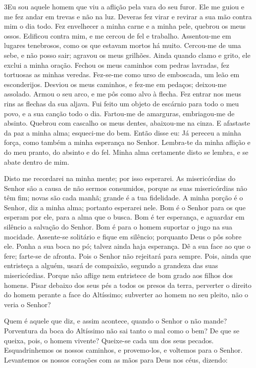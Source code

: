 \medskip

\lettrine{3} Eu sou aquele homem que viu a aflição pela vara
do seu furor. Ele me guiou e me fez andar em trevas e não na
luz. Deveras fez virar e revirar a sua mão contra mim o dia
todo. Fez envelhecer a minha carne e a minha pele, quebrou os
meus ossos. Edificou contra mim, e me cercou de fel e trabalho.
Assentou-me em lugares tenebrosos, como os que estavam mortos há
muito. Cercou-me de uma sebe, e não posso sair; agravou os meus
grilhões. Ainda quando clamo e grito, ele exclui a minha oração.
Fechou os meus caminhos com pedras lavradas, fez tortuosas as
minhas veredas. Fez-se-me como urso de emboscada, um leão em
esconderijos. Desviou os meus caminhos, e fez-me em pedaços;
deixou-me assolado. Armou o seu arco, e me pôs como alvo à
flecha. Fez entrar nos meus rins as flechas da sua aljava.
Fui feito um objeto de escárnio para todo o meu povo, e a sua
canção todo o dia. Fartou-me de amarguras, embriagou-me de
absinto. Quebrou com cascalho os meus dentes, abaixou-me na
cinza. E afastaste da paz a minha alma; esqueci-me do bem.
Então disse eu: Já pereceu a minha força, como também a minha
esperança no Senhor. Lembra-te da minha aflição e do meu
pranto, do absinto e do fel. Minha alma certamente disto se
lembra, e se abate dentro de mim.

Disto me recordarei na minha mente; por isso esperarei. As
misericórdias do Senhor  são a causa de não sermos consumidos,
porque as suas misericórdias não têm fim; novas são cada
manhã; grande é a tua fidelidade. A minha porção é o Senhor,
diz a minha alma; portanto esperarei nele. Bom é o Senhor
para os que esperam por ele, para a alma que o busca. Bom é
ter esperança, e aguardar em silêncio a salvação do Senhor.
Bom é para o homem suportar o jugo na sua mocidade.
Assente-se solitário e fique em silêncio; porquanto Deus o
pôs sobre ele. Ponha a sua boca no pó; talvez ainda haja
esperança. Dê a sua face ao que o fere; farte-se de afronta.
Pois o Senhor não rejeitará para sempre. Pois, ainda
que entristeça a alguém, usará de compaixão, segundo a grandeza das
suas misericórdias. Porque não aflige nem entristece de bom
grado aos filhos dos homens. Pisar debaixo dos seus pés a
todos os presos da terra, perverter o direito do homem
perante a face do Altíssimo; subverter ao homem no seu
pleito, não o veria o Senhor?

Quem é aquele que diz, e assim acontece, quando o Senhor o não
mande? Porventura da boca do Altíssimo não sai tanto o mal
como o bem? De que se queixa, pois, o homem vivente?
Queixe-se cada um dos seus pecados. Esquadrinhemos os nossos
caminhos, e provemo-los, e voltemos para o Senhor. Levantemos
os nossos corações com as mãos para Deus nos céus, dizendo:

